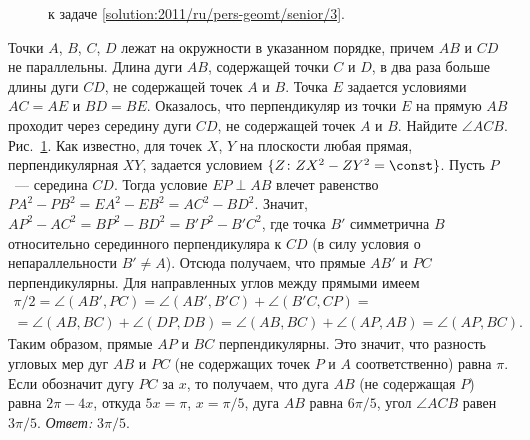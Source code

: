 \ifsolution
\begin{figure}\centering
    \caption{к задаче \ref{solution:2011/ru/pers-geomt/senior/3}.}
    \label{fig:solution:2011/ru/pers-geomt/senior/3}
\end{figure}
\fi %

\problem
Точки $A$, $B$, $C$, $D$ лежат на окружности в указанном порядке, причем $AB$ и
$CD$ не параллельны.
Длина дуги $AB$, содержащей точки $C$ и $D$, в два раза больше длины дуги $CD$,
не содержащей точек $A$ и $B$.
Точка $E$ задается условиями $AC = AE$ и $BD = BE$.
Оказалось, что перпендикуляр из точки $E$ на прямую $AB$ проходит через
середину дуги $CD$, не содержащей точек $A$ и $B$.
Найдите $\angle ACB$.
\solution
\label{solution:2011/ru/pers-geomt/senior/3}%
Рис.~\ref{fig:solution:2011/ru/pers-geomt/senior/3}.
Как известно, для точек $X$, $Y$ на плоскости любая прямая, перпендикулярная
$XY$, задается условием
$\{Z \colon ZX^2 - ZY^2 = \const\}$.
Пусть $P$~--- середина $CD$.
Тогда условие $EP \perp AB$ влечет равенство
$P A^2 - P B^2 = E A^2 - E B^2 = A C^2 - B D^2$.
Значит, $A P^2 - A C^2 = B P^2 - B D^2 = B' P^2 - B' C^2$, где точка $B'$
симметрична $B$ относительно серединного перпендикуляра к $CD$
(в силу условия о непараллельности $B' \neq A$).
Отсюда получаем, что прямые $AB'$ и $PC$ перпендикулярны.
Для направленных углов между прямыми имеем 
\begin{gather*}
    \pi / 2
=
    \angle (AB', PC)
=
    \angle (AB', B'C) + \angle (B'C, CP)
=\\=
    \angle (AB, BC) + \angle (DP, DB)
=
    \angle (AB, BC) + \angle (AP, AB)
=
    \angle (AP, BC)
.\end{gather*}
Таким образом, прямые $AP$ и $BC$ перпендикулярны.
Это значит, что разность угловых мер дуг $AB$ и $PC$
(не содержащих точек $P$ и $A$ соответственно) равна $\pi$.
Если обозначит дугу $PC$ за $x$, то получаем, что дуга $AB$
(не содержащая $P$) равна $2 \pi - 4 x$, откуда $5 x = \pi$, $x = \pi / 5$,
дуга $AB$ равна $6 \pi / 5$, угол $\angle ACB$ равен $3 \pi / 5$.
\emph{Ответ:} $3 \pi / 5$.
\endproblem
